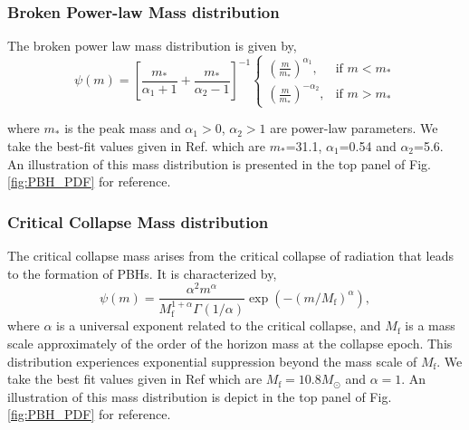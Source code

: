 \documentclass[aps, prd, reprint, nofootinbib]{revtex4-2}
\begin{document}
\begin{appendix}
\subsubsection{Broken Power-law Mass distribution} 
The broken power law mass distribution is given by,
\begin{equation}
\psi(m) = \left[\frac{m_*}{\alpha_1 + 1} + \frac{m_*}{\alpha_2 - 1}\right]^{-1} 
\begin{cases} 
\left(\frac{m}{m_*}\right)^{\alpha_1}, & \text{if } m < m_* \\ 
\left(\frac{m}{m_*}\right)^{-\alpha_2}, & \text{if } m > m_*
\end{cases}
\end{equation}

where $m_*$ is the peak mass and $\alpha_1>0$, $\alpha_2>1$ are power-law parameters. We take the best-fit values given in Ref. \cite{Chen:2024dxh} which are $m_*$=31.1, $\alpha_1$=0.54 and $\alpha_2$=5.6. An illustration of this mass distribution is presented in the top panel of Fig. \ref{fig:PBH_PDF} for reference.

\subsubsection{Critical Collapse Mass distribution}
The critical collapse mass arises from the critical collapse of radiation that leads to the formation of PBHs. It is characterized by,
\begin{equation}
\psi(m)=\frac{\alpha^2 m^\alpha}{M_{\textrm{f}}^{1+\alpha} \Gamma_{\textrm{}}(1 / \alpha)} \exp \left(-\left(m / M_{\textrm{f}}\right)^\alpha\right), 
\end{equation}
where $\alpha$ is a universal exponent related to the critical collapse, and $M_{\textrm{f}}$ is a mass scale approximately of the order of the horizon mass at the collapse epoch. This distribution experiences exponential suppression beyond the mass scale of $M_{\textrm{f}}$. We take the best fit values given in Ref \cite{Chen:2024dxh} which are $M_{\textrm{f}}=10.8 M_{\odot}$ and $\alpha=1$.  An illustration of this mass distribution is depict in the top panel of Fig. \ref{fig:PBH_PDF} for reference.


\end{appendix}
\end{document}
